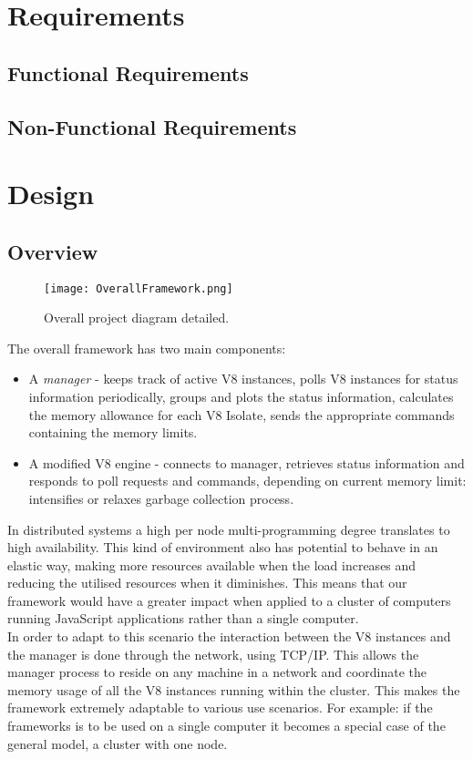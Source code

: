 \documentclass{l4proj}
\begin{document}
\section{Requirements}
\subsection{Functional Requirements}
\subsection{Non-Functional Requirements}

\newpage
\section{Design}
\subsection{Overview}
\begin{figure}[!ht]
  \caption{Overall project diagram detailed.}
  \centering
    \texttt{[image: OverallFramework.png]}
\end{figure}
The overall framework has two main components:
\begin{itemize}
\item A \textit{manager} - keeps track of active V8 instances, polls V8 instances for status information periodically, groups and plots the status information, calculates the memory allowance for each V8 Isolate, sends the appropriate commands containing the memory limits.
\item A modified V8 engine - connects to manager, retrieves status information and responds to poll requests and commands, depending on current memory limit: intensifies or relaxes garbage collection process.
\end{itemize}
\hspace*{3em} In distributed systems a high per node multi-programming degree translates to high availability. This kind of environment also has potential to behave in an elastic way, making more resources available when the load increases and reducing the utilised resources when it diminishes. This means that our framework would have a greater impact when applied to a cluster of computers running JavaScript applications rather than a single computer.\\
\hspace*{3em} In order to adapt to this scenario the interaction between the V8 instances and the manager is done through the network, using TCP/IP. This allows the manager process to reside on any machine in a network and coordinate the memory usage of all the V8 instances running within the cluster. This makes the framework extremely adaptable to various use scenarios. For example: if the frameworks is to be used on a single computer it becomes a special case of the general model, a cluster with one node.
\end{document}

